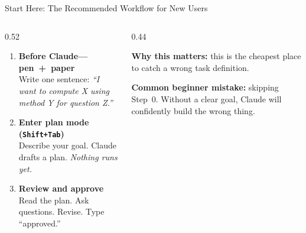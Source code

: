 \documentclass[10pt,english,aspectratio=169]{beamer}
\begin{document}
\begin{frame}{Start Here: The Recommended Workflow for New Users}

\begin{columns}[T]
\begin{column}{0.52\textwidth}
\small
\begin{enumerate}
    \item[\textbf{0.}] \textbf{Before Claude---pen~+~paper}\\
    Write one sentence: \textit{``I want to compute X using method Y for question Z.''}

    \vspace{0.1cm}

    \item[\textbf{1.}] \textbf{Enter plan mode (\texttt{Shift+Tab})}\\
    Describe your goal. Claude drafts a plan. \textit{Nothing runs yet.}

    \vspace{0.1cm}

    \item[\textbf{2.}] \textbf{Review and approve}\\
    Read the plan. Ask questions. Revise. Type ``approved.''
\end{enumerate}
\end{column}
\begin{column}{0.44\textwidth}
\begin{tcolorbox}[colback=blue!3, colframe=RedTitle!60]
\footnotesize
\textbf{Why this matters:} this is the cheapest place to catch a wrong task definition.
\end{tcolorbox}
\vspace{0.2cm}
\footnotesize
\textbf{Common beginner mistake:} skipping Step~0. Without a clear goal, Claude will confidently build the wrong thing.
\end{column}
\end{columns}
\end{frame}
\end{document}
